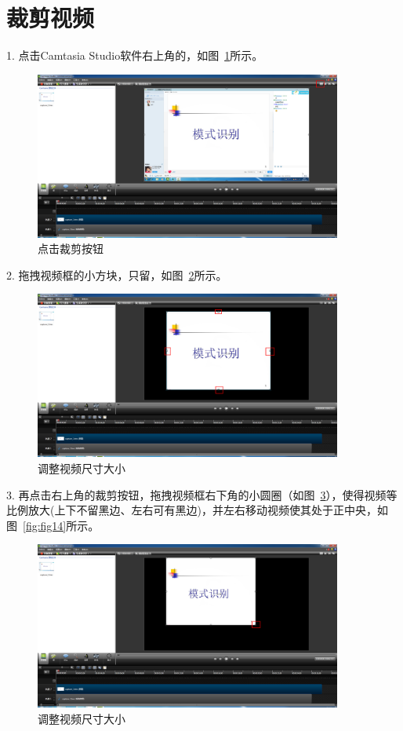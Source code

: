 \documentclass[12pt]{article}
\begin{document}
\section{裁剪视频}
1. 点击Camtasia Studio软件右上角的{\color{blue}{裁剪按钮}}，如图~\ref{fig:fig11}所示。\par
     \begin{figure}
    \centering
    \includegraphics[width=0.9\textwidth]{fig11.png}
    \caption{点击裁剪按钮}
    \label{fig:fig11}
    \end{figure}
2. 拖拽视频框的小方块，只留{\color{blue}{ppt部分}}，如图~\ref{fig:fig12}所示。\par
     \begin{figure}
    \centering
    \includegraphics[width=0.9\textwidth]{fig12.png}
    \caption{调整视频尺寸大小}
    \label{fig:fig12}
    \end{figure}
3. 再点击右上角的裁剪按钮，拖拽视频框右下角的小圆圈（如图~\ref{fig:fig13}），使得视频等比例放大(上下不留黑边、左右可有黑边)，并左右移动视频使其处于正中央，如图~\ref{fig:fig14}所示。\par
     \begin{figure}
    \centering
    \includegraphics[width=0.9\textwidth]{fig13.png}
    \caption{调整视频尺寸大小}
    \label{fig:fig13}
    \end{figure}
\end{document}
